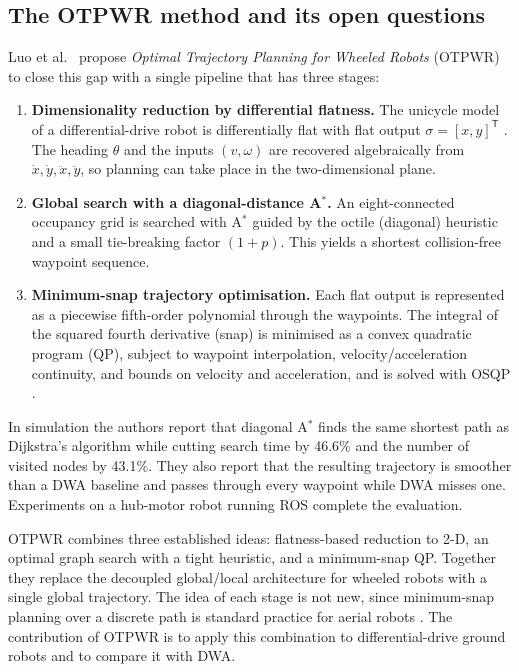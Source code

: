 \documentclass[11pt,a4paper]{article}
\begin{document}
\subsection{The OTPWR method and its open questions}
\label{sec:otpwr}

Luo et al.\ \citep{luo2024otpwr} propose \emph{Optimal Trajectory Planning for
Wheeled Robots} (OTPWR) to close this gap with a single pipeline that has
three stages:
\begin{enumerate}[label=(\roman*),nosep]
  \item \textbf{Dimensionality reduction by differential flatness.} The
        unicycle model of a differential-drive robot is differentially flat
        with flat output $\sigma=[x,y]^{\mathsf T}$
        \citep{fliess1995flatness,murray1995flat}. The heading $\theta$ and
        the inputs $(v,\omega)$ are recovered algebraically from
        $\dot x,\dot y,\ddot x,\ddot y$, so planning can take place in the
        two-dimensional plane.
  \item \textbf{Global search with a diagonal-distance A$^\ast$.} An
        eight-connected occupancy grid is searched with A$^\ast$ guided by
        the octile (diagonal) heuristic and a small tie-breaking factor
        $(1+p)$. This yields a shortest collision-free waypoint sequence.
  \item \textbf{Minimum-snap trajectory optimisation.} Each flat output is
        represented as a piecewise fifth-order polynomial through the
        waypoints. The integral of the squared fourth derivative (snap) is
        minimised as a convex quadratic program (QP), subject to waypoint
        interpolation, velocity/acceleration continuity, and bounds on
        velocity and acceleration, and is solved with OSQP
        \citep{stellato2020osqp}.
\end{enumerate}
In simulation the authors report that diagonal A$^\ast$ finds the same
shortest path as Dijkstra's algorithm while cutting search time by 46.6\%
and the number of visited nodes by 43.1\%. They also report that the
resulting trajectory is smoother than a DWA baseline and passes through every
waypoint while DWA misses one. Experiments on a hub-motor robot running ROS
complete the evaluation.

OTPWR \citep{luo2024otpwr} combines three established ideas: flatness-based
reduction to 2-D, an optimal graph search with a tight heuristic, and a
minimum-snap QP. Together they replace the decoupled global/local
architecture for wheeled robots with a single global trajectory. The idea of
each stage is not new, since minimum-snap planning over a discrete path is
standard practice for aerial robots \citep{richter2016polynomial}. The
contribution of OTPWR is to apply this combination to differential-drive
ground robots and to compare it with DWA.
\end{document}
